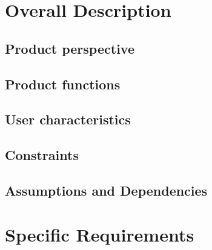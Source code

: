 \documentclass{article}
\begin{document}
	\section{Overall Description}
	\subsection{Product perspective}
	\subsection{Product functions}
	\subsection{User characteristics}
	\subsection{Constraints}
	\subsection{Assumptions and Dependencies}
	\section{Specific Requirements}
	
\end{document}
